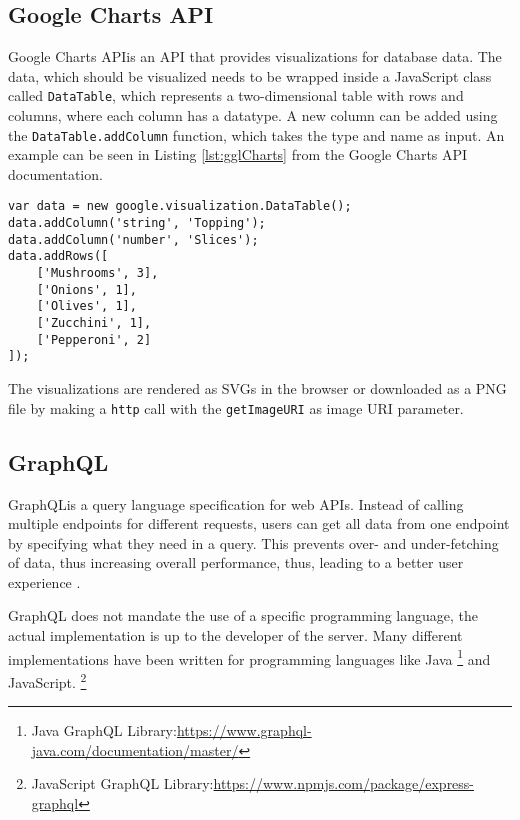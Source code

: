 \subsection{Google Charts API}
Google Charts API\footnotemark is an API that provides visualizations for database data. The data, which should be visualized needs to be wrapped inside a JavaScript class called \texttt{DataTable}, which represents a two-dimensional table with rows and columns, where each column has a datatype.
A new column can be added using the \texttt{DataTable.addColumn} function, which takes the type and name as input. An example can be seen in Listing \ref{lst:gglCharts} from the Google Charts API documentation\footnotemark[\value{footnote}].

\begin{lstlisting}[caption=Example use of the DataTable class,captionpos=b,label={lst:gglCharts}]
var data = new google.visualization.DataTable();
data.addColumn('string', 'Topping');
data.addColumn('number', 'Slices');
data.addRows([
	['Mushrooms', 3],
	['Onions', 1],
	['Olives', 1], 
	['Zucchini', 1],
	['Pepperoni', 2]
]);
\end{lstlisting}

The visualizations are rendered as SVGs in the browser or downloaded as a PNG file by making a \texttt{http} call with the \texttt{getImageURI} as image URI parameter. 

\subsection{GraphQL}
GraphQL\footnotemark is a query language specification for web APIs.
Instead of calling multiple endpoints for different requests, users can get all data from one endpoint by specifying what they need in a query. This prevents over- and under-fetching of data\footnotemark, thus increasing overall performance, thus, leading to a better user experience \cite{KKK20}.


GraphQL does not mandate the use of a specific programming language, the actual implementation is up to the developer of the server. \footnotemark
{}
Many different implementations have been written for programming languages like Java \footnote{Java GraphQL Library:\url{https://www.graphql-java.com/documentation/master/}} and JavaScript. \footnote{JavaScript GraphQL Library:\url{https://www.npmjs.com/package/express-graphql}}

